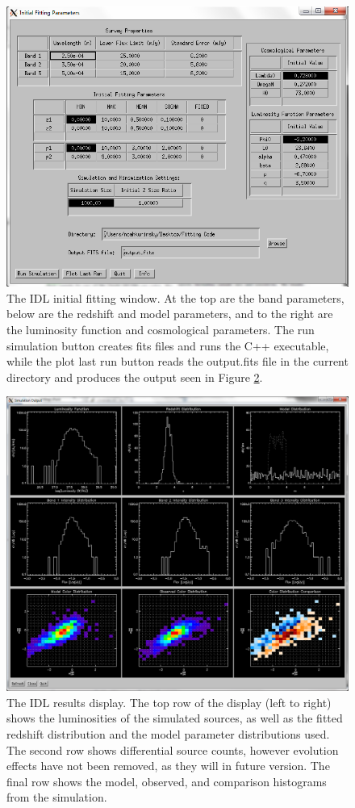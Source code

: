 \documentclass[twocolumn,letterpaper,10pt]{article}
\begin{document}
\begin{figure}
  \includegraphics[width=\textwidth]{initial.png}
  \caption{The IDL initial fitting window. At the top are the band parameters, below are the redshift and model parameters, and to the right are the luminosity function and cosmological parameters. The run simulation button creates fits files and runs the C++ executable, while the plot last run button reads the output.fits file in the current directory and produces the output seen in Figure \ref{disp:res}.}
  \label{disp:init}
\end{figure}

\begin{figure}
  \includegraphics[width=\textwidth]{fitting.png}
  \caption{The IDL results display. The top row of the display (left to right) shows the luminosities of the simulated sources, as well as the fitted redshift distribution and the model parameter distributions used. The second row shows differential source counts, however evolution effects have not been removed, as they will in future version. The final row shows the model, observed, and comparison histograms from the simulation.}
  \label{disp:res}
\end{figure}
\end{document}
